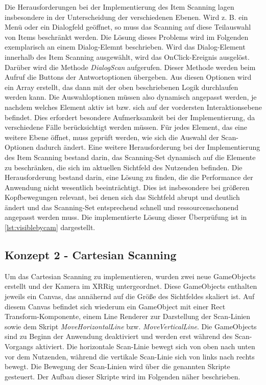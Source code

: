 Die Herausforderungen bei der Implementierung des Item Scanning lagen insbesondere in der Unterscheidung der verschiedenen Ebenen. Wird z. B. ein Menü oder ein Dialogfeld geöffnet, so muss das Scanning auf diese Teilauswahl von Items beschränkt werden. Die Lösung dieses Problems wird im Folgenden exemplarisch an einem Dialog-Elemnt beschrieben. 
Wird das Dialog-Element innerhalb des Item Scanning ausgewählt, wird das OnClick-Ereignis ausgelöst. Darüber wird die Methode \textit{DialogScan} aufgerufen. Dieser Methode werden beim Aufruf die Buttons der Antwortoptionen übergeben. Aus diesen Optionen wird ein Array erstellt, das dann mit der oben beschriebenen Logik durchlaufen werden kann. Die Auswahloptionen müssen also dynamisch angepasst werden, je nachdem welches Element aktiv ist bzw. sich auf der vordersten Interaktionsebene befindet. Dies erfordert besondere Aufmerksamkeit bei der Implementierung, da verschiedene Fälle berücksichtigt werden müssen. Für jedes Element, das eine weitere Ebene öffnet, muss geprüft werden, wie sich die Auswahl der Scan-Optionen dadurch ändert. 
Eine weitere Herausforderung bei der Implementierung des Item Scanning bestand darin, das Scanning-Set dynamisch auf die Elemente zu beschränken, die sich im aktuellen Sichtfeld des Nutzenden befinden. Die Herausforderung bestand darin, eine Lösung zu finden, die die Performance der Anwendung nicht wesentlich beeinträchtigt. Dies ist insbesondere bei größeren Kopfbewegungen relevant, bei denen sich das Sichtfeld abrupt und deutlich ändert und das Scanning-Set entsprechend schnell und ressourcenschonend angepasst werden muss. Die implementierte Lösung dieser Überprüfung ist in \autoref{lst:visiblebycam} dargestellt. 

\subsection{Konzept 2 - Cartesian Scanning}

Um das Cartesian Scanning zu implementieren, wurden zwei neue GameObjects erstellt und der Kamera im XRRig untergeordnet. Diese GameObjects enthalten jeweils ein Canvas, das annähernd auf die Größe des Sichtfeldes skaliert ist. Auf diesem Canvas befindet sich wiederum ein GameObject mit einer Rect Transform-Komponente, einem Line Renderer zur Darstellung der Scan-Linien sowie dem Skript \textit{MoveHorizontalLine} bzw. \textit{MoveVerticalLine}. Die GameObjects sind zu Beginn der Anwendung deaktiviert und werden erst während des Scan-Vorgangs aktiviert.
Die horizontale Scan-Linie bewegt sich von oben nach unten vor dem Nutzenden, während die vertikale Scan-Linie sich von links nach rechts bewegt. Die Bewegung der Scan-Linien wird über die genannten Skripte gesteuert. Der Aufbau dieser Skripte wird im Folgenden näher beschrieben. 

